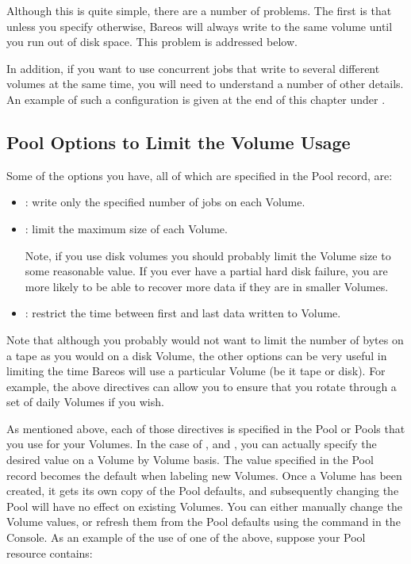 Although this is quite simple, there are a number of problems. The first is
that unless you specify otherwise, Bareos will always write to the same volume
until you run out of disk space. This problem is addressed below.

In addition, if you want to use concurrent jobs that write to several
different volumes at the same time, you will need to understand a number
of other details. An example of such a configuration is given
at the end of this chapter under .

\subsection{Pool Options to Limit the Volume Usage}

Some of the options you have, all of which are specified in the Pool record,
are:

\begin{itemize}
\item {}: write only the specified number of jobs on each Volume.
\item {}: limit the maximum size of each Volume.

   Note, if you use disk volumes you should probably limit the Volume size to some reasonable
   value. If you ever have a partial
   hard disk failure, you are more likely to be able to recover more data
   if they are in smaller Volumes.
\item {}: restrict the time between first and last data written to Volume.
\end{itemize}

Note that although you probably would not want to limit the number of bytes on
a tape as you would on a disk Volume, the other options can be very useful in
limiting the time Bareos will use a particular Volume (be it tape or disk).
For example, the above directives can allow you to ensure that you rotate
through a set of daily Volumes if you wish.

As mentioned above, each of those directives is specified in the Pool or
Pools that you use for your Volumes. In the case of ,
 and ,
you can actually
specify the desired value on a Volume by Volume basis. The value specified in
the Pool record becomes the default when labeling new Volumes. Once a Volume
has been created, it gets its own copy of the Pool defaults, and subsequently
changing the Pool will have no effect on existing Volumes. You can either
manually change the Volume values, or refresh them from the Pool defaults using
the  command in the Console. As an example
of the use of one of the above, suppose your Pool resource contains:

